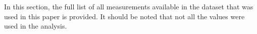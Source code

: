\documentclass[preprint,12pt]{elsarticle}
\begin{document}
In this section, the full list of all measurements available in the dataset that was used in this paper is provided. It should be noted that not all the values were used in the analysis.







\end{document}
